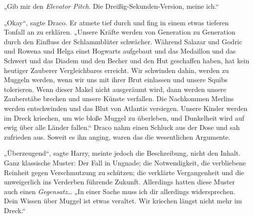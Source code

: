 „Gib mir den \emph{Elevator Pitch}. Die Dreißig-Sekunden-Version, meine ich.“

„Okay“, sagte Draco. Er atmete tief durch und fing in einem etwas tieferen Tonfall an zu erklären. „Unsere Kräfte werden von Generation zu Generation durch den Einfluss der Schlammblüter schwächer. Während Salazar und Godric und Rowena und Helga einst Hogwarts aufgebaut und das Medaillon und das Schwert und das Diadem und den Becher und den Hut geschaffen haben, hat kein heutiger Zauberer Vergleichbares erreicht. Wir schwinden dahin, werden zu Muggeln werden, wenn wir uns mit ihrer Brut einlassen und unsere Squibs tolerieren. Wenn dieser Makel nicht ausgeräumt wird, dann werden unsere Zauberstäbe brechen und unsere Künste verfallen. Die Nachkommen Merlins werden entschwinden und das Blut von Atlantis versiegen. Unsere Kinder werden im Dreck kriechen, um wie bloße Muggel zu überleben, und Dunkelheit wird auf ewig über alle Länder fallen.“ Draco nahm einen Schluck aus der Dose und sah zufrieden aus. Soweit es ihn anging, waren das die wesentlichen Argumente.

„Überzeugend“, sagte Harry, meinte jedoch die Beschreibung, nicht den Inhalt. Ganz klassische Muster: Der Fall in Ungnade; die Notwendigkeit, die verbliebene Reinheit gegen Verschmutzung zu schützen; die verklärte Vergangenheit und die unweigerlich ins Verderben führende Zukunft. Allerdings hatten diese Muster auch einen \emph{Gegensatz}… „In einer Sache muss ich dir allerdings widersprechen. Dein Wissen über Muggel ist etwas veraltet. Wir kriechen längst nicht mehr im Dreck.“

